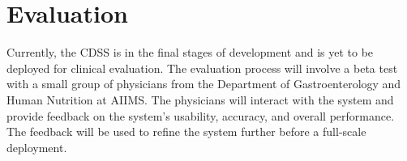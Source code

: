 \section{Evaluation}
Currently, the CDSS is in the final stages of development and is yet to be deployed for clinical evaluation. The evaluation process will involve a beta test with a small group of physicians from the Department of Gastroenterology and Human Nutrition at AIIMS. The physicians will interact with the system and provide feedback on the system's usability, accuracy, and overall performance. The feedback will be used to refine the system further before a full-scale deployment.\\[\baselineskip]
